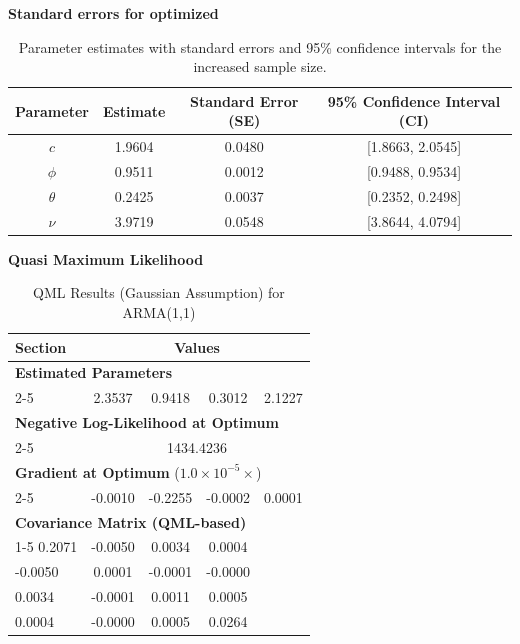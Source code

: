 \documentclass[11pt]{article}
\begin{document}
\textbf{Standard errors for optimized}
\begin{table}[h!]
\centering
\begin{tabular}{|c|c|c|c|}
\hline
\textbf{Parameter} & \textbf{Estimate} & \textbf{Standard Error (SE)} & \textbf{95\% Confidence Interval (CI)} \\ \hline
$c$     & 1.9604 & 0.0480 & [1.8663, 2.0545] \\ \hline
$\phi$  & 0.9511 & 0.0012 & [0.9488, 0.9534] \\ \hline
$\theta$ & 0.2425 & 0.0037 & [0.2352, 0.2498] \\ \hline
$\nu$    & 3.9719 & 0.0548 & [3.8644, 4.0794] \\ \hline
\end{tabular}
\caption{Parameter estimates with standard errors and 95\% confidence intervals for the increased sample size.}
\label{tab:confidence_intervals_large_sample}
\end{table}



\textbf{Quasi Maximum Likelihood}
\begin{table}[h!]
\centering
\caption{QML Results (Gaussian Assumption) for ARMA(1,1)}
\label{tab:qml_results}
\begin{tabular}{@{}lcccc@{}}
\toprule
\textbf{Section} & \multicolumn{4}{c}{\textbf{Values}} \\
\midrule
\multicolumn{5}{l}{\textbf{Estimated Parameters}} \\
\cmidrule(l){2-5}
 & 2.3537 & 0.9418 & 0.3012 & 2.1227 \\
\midrule
\multicolumn{5}{l}{\textbf{Negative Log-Likelihood at Optimum}} \\
\cmidrule(l){2-5}
 & \multicolumn{4}{c}{1434.4236} \\
\midrule
\multicolumn{5}{l}{\textbf{Gradient at Optimum} ($1.0 \times 10^{-5} \times$)} \\
\cmidrule(l){2-5}
 & -0.0010 & -0.2255 & -0.0002 & 0.0001 \\
\midrule
\multicolumn{5}{l}{\textbf{Covariance Matrix (QML-based)}} \\
\cmidrule(l){1-5}
0.2071 & -0.0050 & 0.0034 & 0.0004 & \\
-0.0050 & 0.0001 & -0.0001 & -0.0000 & \\
0.0034 & -0.0001 & 0.0011 & 0.0005 & \\
0.0004 & -0.0000 & 0.0005 & 0.0264 & \\
\bottomrule
\end{tabular}
\end{table}
\end{document}
